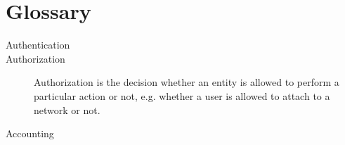 \chapter*{Glossary}


\begin{description}
  \item[Authentication] 
  \item[Authorization] Authorization is the decision whether an entity is allowed to perform a particular action or not, 
       e.g. whether a user is allowed to attach to a network or not.
  \item[Accounting]
\end{description}
